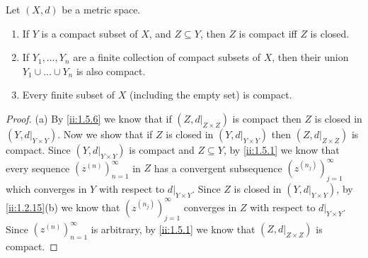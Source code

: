 \begin{thm}\label{ii:1.5.10}
  Let \((X, d)\) be a metric space.
  \begin{enumerate}
    \item If \(Y\) is a compact subset of \(X\), and \(Z \subseteq Y\), then \(Z\) is compact iff \(Z\) is closed.
    \item If \(Y_1, \dots, Y_n\) are a finite collection of compact subsets of \(X\), then their union \(Y_1 \cup \dots \cup Y_n\) is also compact.
    \item Every finite subset of \(X\) (including the empty set) is compact.
  \end{enumerate}
\end{thm}

\begin{proof}{(a)}
  By \cref{ii:1.5.6} we know that if \((Z, d|_{Z \times Z})\) is compact then \(Z\) is closed in \((Y, d|_{Y \times Y})\).
  Now we show that if \(Z\) is closed in \((Y, d|_{Y \times Y})\) then \((Z, d|_{Z \times Z})\) is compact.
  Since \((Y, d|_{Y \times Y})\) is compact and \(Z \subseteq Y\), by \cref{ii:1.5.1} we know that every sequence \((z^{(n)})_{n = 1}^\infty\) in \(Z\) has a convergent subsequence \((z^{(n_j)})_{j = 1}^\infty\) which converges in \(Y\) with respect to \(d|_{Y \times Y}\).
  Since \(Z\) is closed in \((Y, d|_{Y \times Y})\), by \cref{ii:1.2.15}(b) we know that \((z^{(n_j)})_{j = 1}^\infty\) converges in \(Z\) with respect to \(d|_{Y \times Y}\).
  Since \((z^{(n)})_{n = 1}^\infty\) is arbitrary, by \cref{ii:1.5.1} we know that \((Z, d|_{Z \times Z})\) is compact.
\end{proof}

